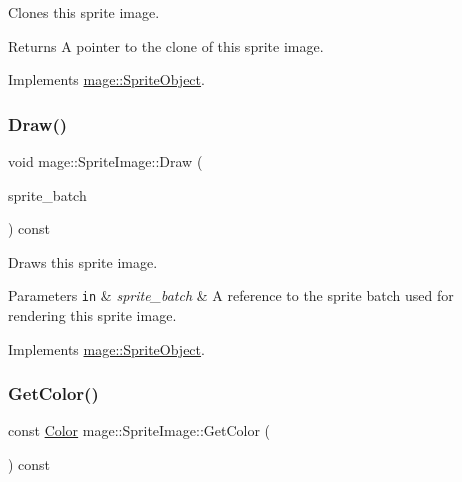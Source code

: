 Clones this sprite image.

\begin{DoxyReturn}{Returns}
A pointer to the clone of this sprite image. 
\end{DoxyReturn}


Implements \hyperlink{classmage_1_1_sprite_object_a7ae445af224769ee5e69c9468670a03f}{mage\+::\+Sprite\+Object}.

\hypertarget{classmage_1_1_sprite_image_ae30d3293931f674fea17008063755bb6}{}\label{classmage_1_1_sprite_image_ae30d3293931f674fea17008063755bb6} 
\subsubsection{\texorpdfstring{Draw()}{Draw()}}
{\footnotesize\ttfamily void mage\+::\+Sprite\+Image\+::\+Draw (\begin{DoxyParamCaption}\item[{Sprite\+Batch \&}]{sprite\+\_\+batch }\end{DoxyParamCaption}) const\hspace{0.3cm}{\ttfamily [virtual]}}

Draws this sprite image.


\begin{DoxyParams}[1]{Parameters}
\mbox{\tt in}  & {\em sprite\+\_\+batch} & A reference to the sprite batch used for rendering this sprite image. \\
\hline
\end{DoxyParams}


Implements \hyperlink{classmage_1_1_sprite_object_a1c1c885fe7846f7ee1cc0b73571c2fa0}{mage\+::\+Sprite\+Object}.

\hypertarget{classmage_1_1_sprite_image_a33dff0d92d5b6505da004ea3587dd0ff}{}\label{classmage_1_1_sprite_image_a33dff0d92d5b6505da004ea3587dd0ff} 
\subsubsection{\texorpdfstring{Get\+Color()}{GetColor()}}
{\footnotesize\ttfamily const \hyperlink{structmage_1_1_color}{Color} mage\+::\+Sprite\+Image\+::\+Get\+Color (\begin{DoxyParamCaption}{ }\end{DoxyParamCaption}) const}

